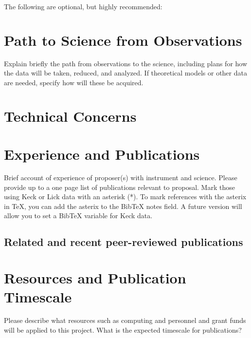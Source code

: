 \documentclass[edit]{Keck}
\begin{document}
The following are optional, but highly recommended:

\section{Path to Science from Observations} %
\label{sec:path_to_science_from_observations}

Explain briefly the path from observations to the science, including plans for how the data will be taken, reduced, and analyzed. If theoretical models or other data are needed, specify how will these be acquired.


\section{Technical Concerns} %
\label{sec:technical_concerns}



\section{Experience and Publications} %
\label{sec:experience_and_publications}

Brief account of experience of proposer(s) with instrument and science. Please provide up to a one page list of publications relevant to proposal. Mark those using Keck or Lick data with an asterisk (*). To mark references with the asterix in TeX, you can add the asterix to the BibTeX notes field. A future version will allow you to set a BibTeX variable for Keck data.

\subsection{Related and recent peer-reviewed publications} %
\label{sub:related_and_recent_peer_reviewed_publications}




\section{Resources and Publication Timescale} %
\label{sec:resources_and_publication_timescale}

Please describe what resources such as computing and personnel and grant funds will be applied to this project. What is the expected timescale for publications?

\end{document}
